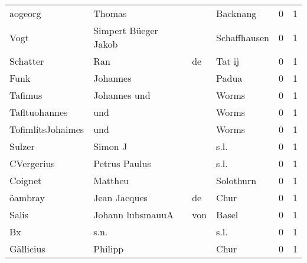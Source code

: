 \begin{tabular}{llllrr}
                  aogeorg &                             Thomas &             &                                    Backnang &          0 &         1 \\
                     Vogt &               Simpert Büeger Jakob &             &                                Schaffhausen &          0 &         1 \\
                 Schatter &                                Ran &          de &                                      Tat ij &          0 &         1 \\
                     Funk &                           Johannes &             &                                       Padua &          0 &         1 \\
                  Tafimus &                       Johannes und &             &                                       Worms &          0 &         1 \\
            Tafltuohannes &                                und &             &                                       Worms &          0 &         1 \\
        TofimlitsJohaimes &                                und &             &                                       Worms &          0 &         1 \\
                   Sulzer &                            Simon J &             &                                        s.l. &          0 &         1 \\
               CVergerius &                      Petrus Paulus &             &                                        s.l. &          0 &         1 \\
                  Coignet &                            Mattheu &             &                                   Solothurn &          0 &         1 \\
                  öambray &                       Jean Jacques &          de &                                        Chur &          0 &         1 \\
                    Salis &                  Johann  lubsmauuA &         von &                                       Basel &          0 &         1 \\
                       Bx &                               s.n. &             &                                        s.l. &          0 &         1 \\
                Gällicius &                            Philipp &             &                                        Chur &          0 &         1 \\

\end{tabular}
